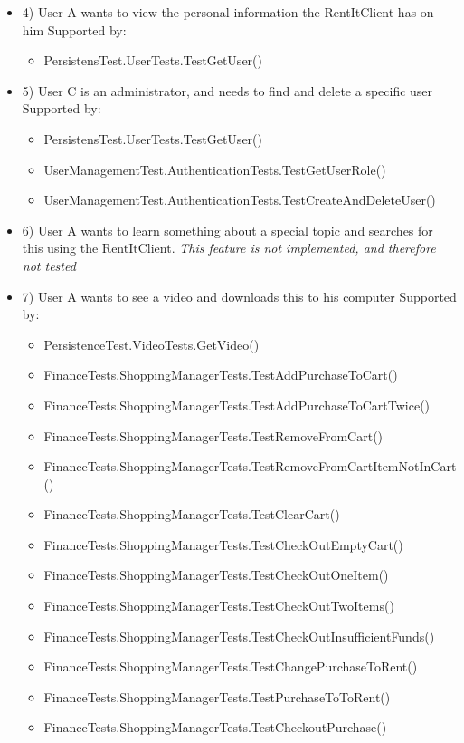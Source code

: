 \begin{itemize}
\item 4)
User A wants to view the personal information the  RentItClient has on him
\newline Supported by:
\begin{itemize}
\item PersistensTest.UserTests.TestGetUser()
\end{itemize}

\item 5)
User C is an administrator, and needs to find and delete a specific user
\newline Supported by:
\begin{itemize}
\item PersistensTest.UserTests.TestGetUser()
\item UserManagementTest.AuthenticationTests.TestGetUserRole()
\item UserManagementTest.AuthenticationTests.TestCreateAndDeleteUser()
\end{itemize}

\item 6) 
User A wants to learn something about a special topic and searches for this using the RentItClient. 
\newline \textit{This feature is not implemented, and therefore not tested}

\item 7)
User A wants to see a video and downloads this to his computer
\newline Supported by:
\begin{itemize}
\item PersistenceTest.VideoTests.GetVideo()
\item FinanceTests.ShoppingManagerTests.TestAddPurchaseToCart()
\item FinanceTests.ShoppingManagerTests.TestAddPurchaseToCartTwice()
\item FinanceTests.ShoppingManagerTests.TestRemoveFromCart()
\item FinanceTests.ShoppingManagerTests.TestRemoveFromCartItemNotInCart()
\item FinanceTests.ShoppingManagerTests.TestClearCart()
\item FinanceTests.ShoppingManagerTests.TestCheckOutEmptyCart()
\item FinanceTests.ShoppingManagerTests.TestCheckOutOneItem()
\item FinanceTests.ShoppingManagerTests.TestCheckOutTwoItems()
\item FinanceTests.ShoppingManagerTests.TestCheckOutInsufficientFunds()
\item FinanceTests.ShoppingManagerTests.TestChangePurchaseToRent()
\item FinanceTests.ShoppingManagerTests.TestPurchaseToToRent()
\item FinanceTests.ShoppingManagerTests.TestCheckoutPurchase()
\end{itemize}


\end{itemize}

